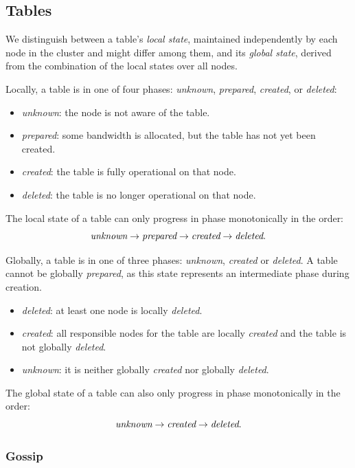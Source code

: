 \subsection{Tables}
\label{subsec:impl-tables}

We distinguish between a table's \emph{local state}, maintained independently
by each node in the cluster and might differ among them, and its \emph{global
state}, derived from the combination of the local states over all nodes.

Locally, a table is in one of four phases: \emph{unknown}, \emph{prepared},
\emph{created}, or \emph{deleted}:
\begin{itemize}
    \item \emph{unknown}: the node is not aware of the table.
    \item \emph{prepared}: some bandwidth is allocated, but the table has not
        yet been created.
    \item \emph{created}: the table is fully operational on that node.
    \item \emph{deleted}: the table is no longer operational on that node.
\end{itemize}
The local state of a table can only progress in phase monotonically in the order:
\[
    \emph{unknown} \rightarrow \emph{prepared} \rightarrow \emph{created}
    \rightarrow \emph{deleted}.
\]

Globally, a table is in one of three phases: \emph{unknown}, \emph{created} or
\emph{deleted}.
A table cannot be globally \emph{prepared}, as this state represents an
intermediate phase during creation.
\begin{itemize}
    \item \emph{deleted}: at least one node is locally \emph{deleted}.
    \item \emph{created}: all responsible nodes for the table are locally
        \emph{created} and the table is not globally \emph{deleted}.
    \item \emph{unknown}: it is neither globally \emph{created} nor globally
        \emph{deleted}.
\end{itemize}
The global state of a table can also only progress in phase monotonically in the order:
\[
    \emph{unknown} \rightarrow \emph{created} \rightarrow \emph{deleted}.
\]

\subsubsection{Gossip}
\label{subsubsec:gossip}

